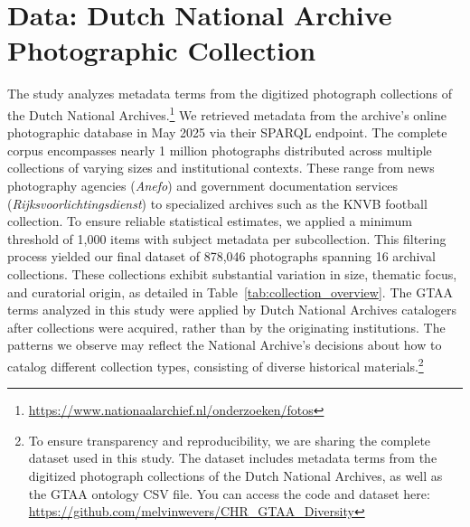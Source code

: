 \documentclass[final]{anthology-ch}
\begin{document}
\section{Data: Dutch National Archive Photographic Collection}
The study analyzes metadata terms from the digitized photograph collections of the Dutch National Archives.\footnote{\url{https://www.nationaalarchief.nl/onderzoeken/fotos}} We retrieved metadata from the archive's online photographic database in May 2025 via their SPARQL endpoint.  
The complete corpus encompasses nearly 1 million photographs distributed across multiple collections of varying sizes and institutional contexts. These range from news photography agencies (\textit{Anefo}) and government documentation services (\textit{Rijksvoorlichtingsdienst}) to specialized archives such as the KNVB football collection. 
To ensure reliable statistical estimates, we applied a minimum threshold of 1,000 items with subject metadata per subcollection. This filtering process yielded our final dataset of 878,046 photographs spanning 16 archival collections. These collections exhibit substantial variation in size, thematic focus, and curatorial origin, as detailed in Table~\ref{tab:collection_overview}.
The GTAA terms analyzed in this study were applied by Dutch National Archives catalogers after collections were acquired, rather than by the originating institutions. The patterns we observe may reflect the National Archive's decisions about how to catalog different collection types, consisting of diverse historical materials.\footnote{To ensure transparency and reproducibility, we are sharing the complete dataset used in this study. The dataset includes metadata terms from the digitized photograph collections of the Dutch National Archives, as well as the GTAA ontology CSV file. You can access the code and dataset here: \url{https://github.com/melvinwevers/CHR_GTAA_Diversity}}
\end{document}
